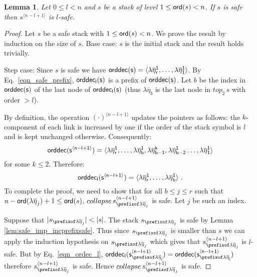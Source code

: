 \documentclass[a4paper]{article}
\newtheorem{lemma}{Lemma}[section]
\theoremstyle{remark}
\theoremstyle{definition}
\newcommand\orddec{\sf orddec}
\begin{document}
\begin{lemma}
\label{lem:incrk_qsafe}
Let $0\leq l < n$ and $s$ be a stack of level $1\leq {\sf ord}(s) <n$.
If $s$ is safe then $s^{\langle n-l+1 \rangle}$ is $l$-safe.
\end{lemma}
\begin{proof}
Let $s$ be a safe stack with $1\leq {\sf ord}(s) <n$. We prove the result by induction on the size of $s$.
Base case: $s$ is the initial stack and the result holds trivially.

Step case: Since $s$ is safe we have
$\orddec(s) = \langle \lambda \overline{\eta}_r^1
, \ldots, \lambda \overline{\eta}_1^1   \rangle$.
By Eq.\ \ref{eqn_safe_prefix}, $\orddec_l(s)$ is a prefix of $\orddec(s)$.
Let $b$ be the index in $\orddec(s)$ of the last node of $\orddec_l(s)$
(thus $\lambda\overline\eta_b$ is the last node in $top_2\, s$ with order $>l$).

By definition, the operation $(\cdot)^{\langle n-l+1 \rangle}$ updates the pointers as follows:
the $k$-component of each link is increased by one if the order of
the stack symbol is $l$ and is kept unchanged otherwise.
Consequently:
\begin{equation*}
\orddec(s^{\langle n-l+1 \rangle}) = \langle
\lambda \overline{\eta}_r^1, \ldots,  \lambda \overline{\eta}_{b}^1, \lambda \overline{\eta}_{b-1}^{k}, \lambda \overline{\eta}_{b-2}^1 \ldots,
 \lambda \overline{\eta}_1^{1} \rangle
\end{equation*}
for some $k\leq 2$. Therefore:
\begin{equation*}
\orddec_l(s^{\langle n-l+1 \rangle}) = \langle \lambda \overline{\eta}_r^1
, \ldots, \lambda \overline{\eta}_b^1 \rangle\ .
\label{eqn_ordec_l}
\end{equation*}
To complete the proof, we need to show that
for all $b\leq j \leq r$ such that $n-{\sf ord}(\lambda \overline{\eta}_{j}) +1 \leq {\sf ord}(s)$, $collapse\, s^{\langle n-l+1 \rangle}_{\prefixof \lambda \overline{\eta}_{j}}$ is safe. Let $j$ be such an index.

Suppose that $|s_{\prefixof \lambda\overline\eta_j}|<|s|$.
The stack $s_{\prefixof \lambda\overline\eta_j}$ is safe by Lemma \ref{lem:safe_imp_incprefixsafe}. Thus since $s_{\prefixof \lambda\overline\eta_j}$ is smaller than $s$ we can apply the induction hypothesis on $s_{\prefixof \lambda\overline\eta_j}$ which gives that $s_{\prefixof \lambda\overline\eta_j}^{\langle n-l+1\rangle}$ is $l$-safe. But by
Eq.\ \ref{eqn_ordec_l},  $\orddec_l(s_{\prefixof \lambda\overline\eta_j}^{\langle n-l+1\rangle})
= \orddec(s_{\prefixof \lambda\overline\eta_j}^{\langle n-l+1\rangle})$
therefore $s_{\prefixof \lambda\overline\eta_j}^{\langle n-l+1\rangle}$
is safe. Hence $collapse\, s_{\prefixof \lambda\overline\eta_j}^{\langle n-l+1\rangle}$ is safe.




\end{proof}
\end{document}
